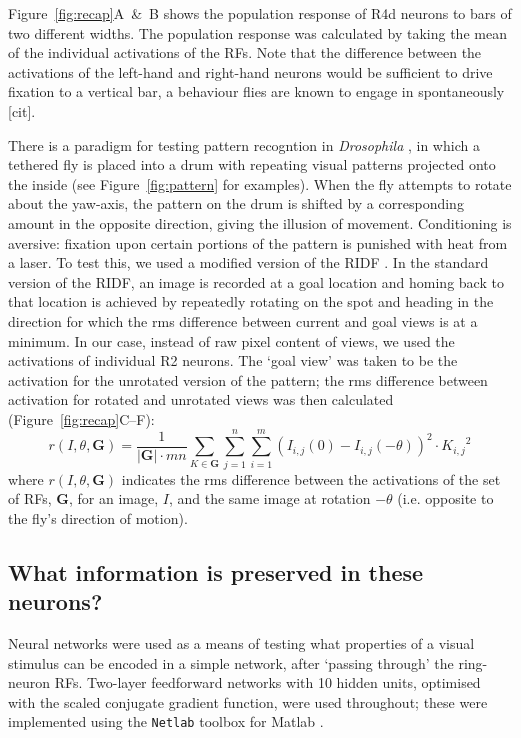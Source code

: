 Figure~\ref{fig:recap}A~\&~B shows the population response of R4d neurons to bars of two different widths.
The population response was calculated by taking the mean of the individual activations of the \acp{RF}.
Note that the difference between the activations of the left-hand and right-hand neurons would be sufficient to drive fixation to a vertical bar, a behaviour flies are known to engage in spontaneously [cit].

There is a paradigm for testing pattern recogntion in \emph{Drosophila} \cite{Liu2006,Ernst1999}, in which a tethered fly is placed into a drum with repeating visual patterns projected onto the inside (see Figure~\ref{fig:pattern} for examples).
When the fly attempts to rotate about the yaw-axis, the pattern on the drum is shifted by a corresponding amount in the opposite direction, giving the illusion of movement.
Conditioning is aversive: fixation upon certain portions of the pattern is punished with heat from a laser.
To test this, we used a modified version of the \ac{RIDF} \cite{Philippides2011,Zeil2003}.
In the standard version of the \ac{RIDF}, an image is recorded at a goal location and homing back to that location is achieved by repeatedly rotating on the spot and heading in the direction for which the \ac{rms} difference between current and goal views is at a minimum.
In our case, instead of raw pixel content of views, we used the activations of individual R2 neurons.
The `goal view' was taken to be the activation for the unrotated version of the pattern; the \ac{rms} difference between activation for rotated and unrotated views was then calculated (Figure~\ref{fig:recap}C--F):
$$
r(I,\theta,\bm{G}) = \frac{1}{|\bm{G}|\cdot mn} {\sum\limits_{K \in \bm{G}} \sum\limits^n_{j=1} \sum\limits^m_{i=1} (I_{i,j}(0)-I_{i,j}(-\theta))^2 \cdot {K_{i,j}}^2}
$$
where $r(I,\theta,\bm{G})$ indicates the \ac{rms} difference between the activations of the set of \acp{RF}, $\bm{G}$, for an image, $I$, and the same image at rotation $-\theta$ (i.e. opposite to the fly's direction of motion).

\subsection{What information is preserved in these neurons?}
Neural networks were used as a means of testing what properties of a visual stimulus can be encoded in a simple network, after `passing through' the ring-neuron \acp{RF}.
Two-layer feedforward networks with 10 hidden units, optimised with the scaled conjugate gradient function, were used throughout; these were implemented using the \texttt{Netlab} toolbox for Matlab \cite{netlab}.

